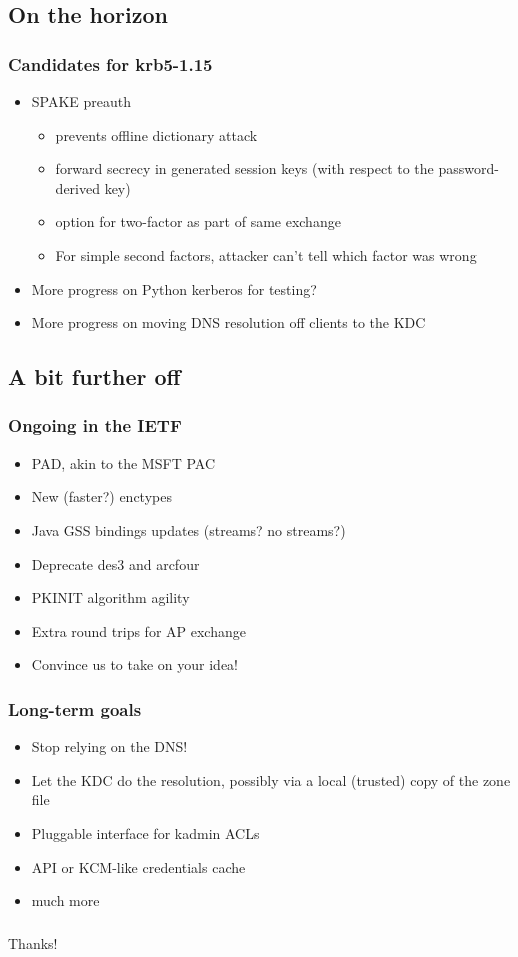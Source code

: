 \documentclass{beamer}
\begin{document}
\subsection{On the horizon}

\begin{frame}
\frametitle{Candidates for krb5-1.15}
\begin{itemize}
\item{SPAKE preauth}
	\begin{itemize}
	\item{prevents offline dictionary attack}
	\item{forward secrecy in generated session keys (with respect to
		the password-derived key)}
	\item{option for two-factor as part of same exchange}
	\item{For simple second factors, attacker can't tell which factor was
		wrong}
	\end{itemize}
\item{More progress on Python kerberos for testing?}
\item{More progress on moving DNS resolution off clients to the KDC}
\end{itemize}
\end{frame}

\subsection{A bit further off}

\begin{frame}
\frametitle{Ongoing in the IETF}
\begin{itemize}
\item{PAD, akin to the MSFT PAC}
\item{New (faster?) enctypes}
\item{Java GSS bindings updates (streams?  no streams?)}
\item{Deprecate des3 and arcfour}
\item{PKINIT algorithm agility}
\item{Extra round trips for AP exchange}
\item{Convince us to take on your idea!}
\end{itemize}
\end{frame}

\begin{frame}
\frametitle{Long-term goals}
\begin{itemize}
\item{Stop relying on the DNS!}
\item{Let the KDC do the resolution, possibly via a local (trusted) copy
	of the zone file}
\item{Pluggable interface for kadmin ACLs}
\item{API or KCM-like credentials cache}
\item{much more}
\end{itemize}
\end{frame}

\begin{frame}
\frametitle{}
\Large{Thanks!}
\end{frame}
\end{document}

